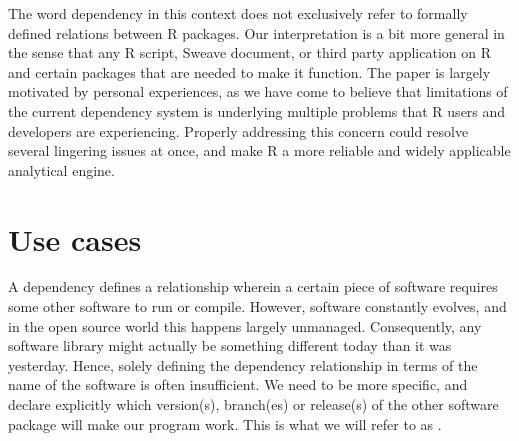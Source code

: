 The word dependency in this context does not exclusively refer to formally
defined relations between R packages. Our interpretation is a bit more general in
the sense that any R script, Sweave document, or third party application
 on R and certain packages that are needed to make it function.
The paper is largely motivated by personal experiences, as we have come to
believe that limitations of the current dependency system is underlying
multiple problems that R users and developers are experiencing. Properly
addressing this concern could resolve several lingering issues at once,
and make R a more reliable and widely applicable analytical engine.




%
%
%













\section{Use cases}

A dependency defines a relationship wherein a certain piece of software requires
some other software to run or compile. However, software constantly evolves, and in
the open source world this happens largely unmanaged. Consequently, any software
library might actually be something different today than it was yesterday.
Hence, solely defining the dependency relationship in terms of the name of the
software is often insufficient. We need to be more specific, and declare
explicitly which version(s), branch(es) or release(s) of the other software
package will make our program work. This is what we will refer to as
.

